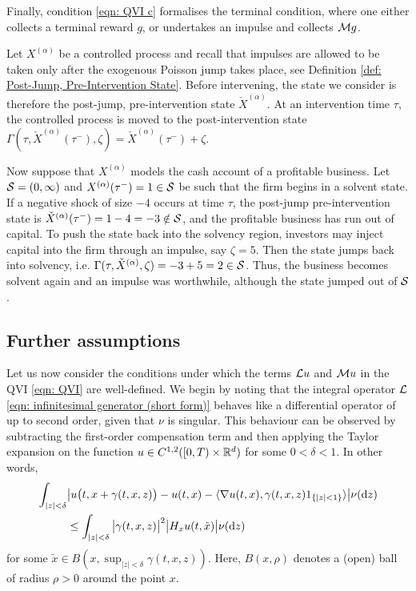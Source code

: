 Finally, condition \eqref{eqn: QVI c} formalises the terminal condition, where one either collects a terminal reward $g$, or undertakes an impulse and collects $\mathcal{M} g$. 

\begin{example}
\label{ex: solvency time notice}
    Let $X^{(\alpha)}$ be a controlled process and recall that impulses are allowed to be taken only after the exogenous Poisson jump takes place, see Definition \ref{def: Post-Jump, Pre-Intervention State}. Before intervening, the state we consider is therefore the post-jump, pre-intervention state $\check{X}^{(\alpha)}$. At an intervention time $\tau$, the controlled process is moved to the post-intervention state $\Gamma(\tau, \check{X}^{(\alpha)}(\tau^-), \zeta) = \check{X}^{(\alpha)}(\tau^-) + \zeta$. 

    Now suppose that $X^{(\alpha)}$ models the cash account of a profitable business. Let $\mathcal{S} = (0,\infty)$ and $X^{(\alpha)}(\tau^-) = 1 \in \mathcal{S}$ be such that the firm begins in a solvent state. If a negative shock of size $-4$ occurs at time $\tau$, the post-jump pre-intervention state is $\check{X}^{(\alpha)}(\tau^-) = 1-4 = -3 \notin \mathcal{S}$, and the profitable business has run out of capital. To push the state back into the solvency region, investors may inject capital into the firm through an impulse, say $\zeta=5$. Then the state jumps back into solvency, i.e. $\Gamma(\tau, \check{X}^{(\alpha)},\zeta) = -3 + 5 = 2 \in \mathcal{S}$. Thus, the business becomes solvent again and an impulse was worthwhile, although the state jumped out of $\mathcal{S}$.
\end{example}

\subsection{Further assumptions}
Let us now consider the conditions under which the terms $\mathcal{L} u$ and $\mathcal{M} u$ in the QVI \eqref{eqn: QVI} are well-defined. We begin by noting that the integral operator $\mathcal{L}$ \eqref{eqn: infinitesimal generator (short form)} behaves like a differential operator of up to second order, given that $\nu$ is singular. This behaviour can be observed by subtracting the first-order compensation term and then applying the Taylor expansion on the function $u \in C^{1,2}([0,T) \times \mathbb{R}^d)$ for some $0 < \delta < 1$. In other words,
\begin{align}
    \int_{|z|<\delta} & \big| u\big(t,x+\gamma(t,x,z)\big) -u(t,x) - \langle \nabla u(t,x), \gamma(t,x,z) 1_{\left\{|z|<1\right\}} \rangle \big| \nu(\mathrm{d} z) \nonumber \\
    & \leq \int_{|z|<\delta} \big| \gamma(t,x,z) \big|^2 \big| H_xu(t,\tilde x) \big| \nu(\mathrm{d} z)
    \label{eqn: (12) in Seydel}
\end{align}
for some $\tilde x \in B(x,\sup_{|z|<\delta} \gamma(t,x,z))$. Here, $B(x,\rho)$ denotes a (open) ball of radius $\rho>0$ around the point $x$. 

